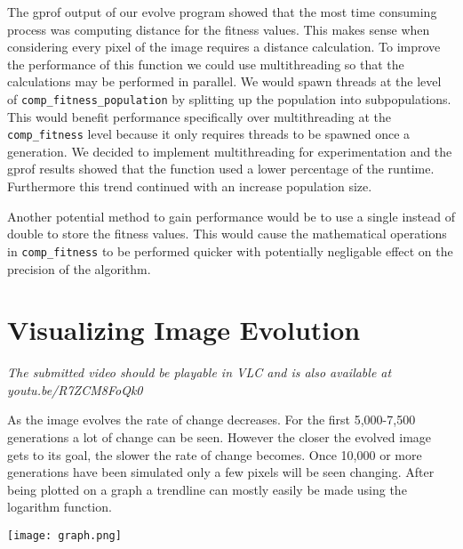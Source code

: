 \documentclass{article}
\begin{document}
The gprof output of our evolve program showed that the most time consuming process was computing distance for the fitness values. This makes sense when considering every pixel of the image requires a distance calculation. To improve the performance of this function we could use multithreading so that the calculations may be performed in parallel. We would spawn threads at the level of \texttt{comp\_fitness\_population} by splitting up the population into subpopulations. This would benefit performance specifically over multithreading at the \texttt{comp\_fitness} level because it only requires threads to be spawned once a generation. We decided to implement multithreading for experimentation and the gprof results showed that the function used a lower percentage of the runtime. Furthermore this trend continued with an increase population size.

Another potential method to gain performance would be to use a single instead of double to store the fitness values. This would cause the mathematical operations in \texttt{comp\_fitness} to be performed quicker with potentially negligable effect on the precision of the algorithm. 


\section*{Visualizing Image Evolution}
\textsl{The submitted video should be playable in VLC and is also available at youtu.be/R7ZCM8FoQk0}\vspace{1mm}

As the image evolves the rate of change decreases. For the first 5,000-7,500 generations a lot of change can be seen. However the closer the evolved image gets to its goal, the slower the rate of change becomes. Once 10,000 or more generations have been simulated only a few pixels will be seen changing. After being plotted on a graph a trendline can mostly easily be made using the logarithm function.

\begin{center}
	\vspace{4mm} \texttt{[image: graph.png]} 
\end{center}
\end{document}
